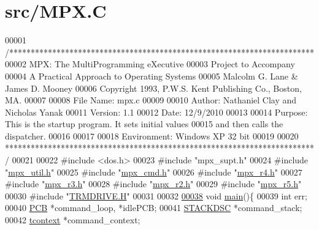 \hypertarget{_m_p_x_8_c_source}{
\section{src/MPX.C}
}

\begin{DoxyCode}
00001 \textcolor{comment}{/***********************************************************************}
00002 \textcolor{comment}{        MPX: The MultiProgramming eXecutive}
00003 \textcolor{comment}{        Project to Accompany}
00004 \textcolor{comment}{        A Practical Approach to Operating Systems}
00005 \textcolor{comment}{        Malcolm G. Lane & James D. Mooney}
00006 \textcolor{comment}{        Copyright 1993, P.W.S. Kent Publishing Co., Boston, MA.}
00007 \textcolor{comment}{}
00008 \textcolor{comment}{        File Name:      mpx.c}
00009 \textcolor{comment}{}
00010 \textcolor{comment}{        Author: Nathaniel Clay and Nicholas Yanak}
00011 \textcolor{comment}{        Version: 1.1}
00012 \textcolor{comment}{        Date:  12/9/2010}
00013 \textcolor{comment}{}
00014 \textcolor{comment}{        Purpose: This is the startup program. It sets initial values}
00015 \textcolor{comment}{        and then calls the dispatcher.}
00016 \textcolor{comment}{}
00017 \textcolor{comment}{                }
00018 \textcolor{comment}{        Environment: Windows XP 32 bit}
00019 \textcolor{comment}{}
00020 \textcolor{comment}{************************************************************************/}
00021 
00022 \textcolor{preprocessor}{#include <dos.h>}
00023 \textcolor{preprocessor}{#include "mpx\_supt.h"}
00024 \textcolor{preprocessor}{#include "\hyperlink{mpx__util_8h}{mpx_util.h}"}
00025 \textcolor{preprocessor}{#include "\hyperlink{mpx__cmd_8h}{mpx_cmd.h}"}
00026 \textcolor{preprocessor}{#include "\hyperlink{mpx__r4_8h}{mpx_r4.h}"}
00027 \textcolor{preprocessor}{#include "\hyperlink{_m_p_x___r3_8_h}{mpx_r3.h}"}
00028 \textcolor{preprocessor}{#include "\hyperlink{mpx__r2_8h}{mpx_r2.h}"}
00029 \textcolor{preprocessor}{#include "\hyperlink{_m_p_x___r5_8h}{mpx_r5.h}"}
00030 \textcolor{preprocessor}{#include "\hyperlink{trmdrive_8h}{TRMDRIVE.H}"}
00031 
00032 
\hypertarget{_m_p_x_8_c_source_l00038}{}\hyperlink{_m_p_x_8_c_acdef7a1fd863a6d3770c1268cb06add3}{00038} \textcolor{keywordtype}{void} \hyperlink{_m_p_x_8_c_acdef7a1fd863a6d3770c1268cb06add3}{main}()\{
00039         \textcolor{keywordtype}{int} err;
00040         \hyperlink{structprocess}{PCB} *command\_loop, *idlePCB;
00041         \hyperlink{structstack}{STACKDSC} *command\_stack;
00042         \hyperlink{structcontext}{tcontext} *command\_context;

\end{DoxyCode}
